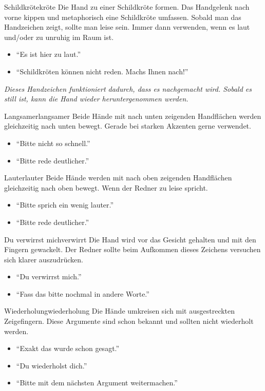 \begin{handzeichen}[.2\linewidth]{Schildkröte}{kröte}
Die Hand zu einer Schildkröte formen. Das Handgelenk nach vorne kippen und metaphorisch eine Schildkröte umfassen. Sobald man das Handzeichen zeigt, sollte man leise sein.
Immer dann verwenden, wenn es laut und/oder zu unruhig im Raum ist.
\begin{itemize}
	\item \enquote{Es ist hier zu laut.}
	\item \enquote{Schildkröten können nicht reden. Machs Ihnen nach!}
\end{itemize}
\end{handzeichen}

\emph{
    Dieses Handzeichen funktioniert dadurch, dass es nachgemacht wird.
    Sobald es still ist, kann die Hand wieder heruntergenommen werden.
}

\begin{handzeichen}{Langsamer}{langsamer}
Beide Hände mit nach unten zeigenden Handflächen werden gleichzeitig nach unten bewegt. Gerade bei starken Akzenten gerne verwendet.
\begin{itemize}
	\item \enquote{Bitte nicht so schnell.}
	\item \enquote{Bitte rede deutlicher.}
\end{itemize}
\end{handzeichen}

\begin{handzeichen}{Lauter}{lauter}
Beide Hände werden mit nach oben zeigenden Handflächen gleichzeitig nach oben bewegt.
Wenn der Redner zu leise spricht.
\begin{itemize}
	\item \enquote{Bitte sprich ein wenig lauter.}
	\item \enquote{Bitte rede deutlicher.}
\end{itemize}
\end{handzeichen}

\begin{handzeichen}{Du verwirrst mich}{verwirrt}
Die Hand wird vor das Gesicht gehalten und mit den Fingern gewackelt. Der Redner sollte beim Aufkommen dieses Zeichens versuchen sich klarer auszudrücken.
\begin{itemize}
	\item \enquote{Du verwirrst mich.}
	\item \enquote{Fass das bitte nochmal in andere Worte.}
\end{itemize}
\end{handzeichen}

\begin{handzeichen}{Wiederholung}{wiederholung}
Die Hände umkreisen sich mit ausgestreckten Zeigefingern. 
Diese Argumente sind schon bekannt und sollten nicht wiederholt werden.
\begin{itemize}
	\item \enquote{Exakt das wurde schon gesagt.}
	\item \enquote{Du wiederholst dich.}
	\item \enquote{Bitte mit dem nächsten Argument weitermachen.}
\end{itemize}
\end{handzeichen}
